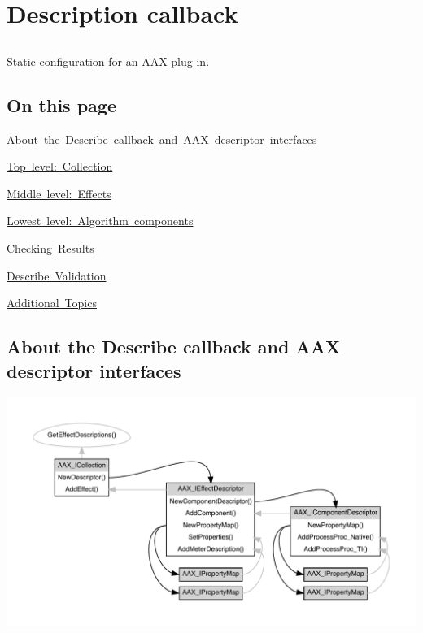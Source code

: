 \hypertarget{a00796}{}\section{Description callback}
\label{a00796}


\subsection{ }
Static configuration for an A\+AX plug-\/in. 

\hypertarget{a00796_describe_contents}{}\subsection{On this page}\label{a00796_describe_contents}
\begin{DoxyItemize}
\item \mbox{\hyperlink{a00796_describe_about}{About the Describe callback and A\+AX descriptor interfaces}} \item \mbox{\hyperlink{a00796_describe_collection}{Top level\+: Collection}} \item \mbox{\hyperlink{a00796_describe_effects}{Middle level\+: Effects}} \item \mbox{\hyperlink{a00796_describe_component}{Lowest level\+: Algorithm components}} \item \mbox{\hyperlink{a00796_describe_checking_results}{Checking Results}} \item \mbox{\hyperlink{a00796_describe_validation}{Describe Validation}} \item \mbox{\hyperlink{a00796_describe_additionaltopics}{Additional Topics}}\end{DoxyItemize}
 \hypertarget{a00796_describe_about}{}\subsection{About the Describe callback and A\+A\+X descriptor interfaces}\label{a00796_describe_about}
 
\begin{DoxyImageNoCaption}
  \mbox{\includegraphics[width=\textwidth,height=\textheight/2,keepaspectratio=true]{dot_aax_desc_interfaces}}
\end{DoxyImageNoCaption}


